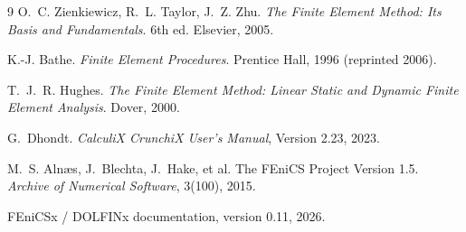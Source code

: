 \begin{thebibliography}{9}
O.~C. Zienkiewicz, R.~L. Taylor, J.~Z. Zhu.
\textit{The Finite Element Method: Its Basis and Fundamentals}. 6th ed.
Elsevier, 2005.

K.-J. Bathe.
\textit{Finite Element Procedures}. Prentice Hall, 1996 (reprinted 2006).

T.~J.~R. Hughes.
\textit{The Finite Element Method: Linear Static and Dynamic Finite Element Analysis}.
Dover, 2000.

G.~Dhondt.
\textit{CalculiX CrunchiX User's Manual}, Version 2.23, 2023.

M.~S. Aln{\ae}s, J.~Blechta, J.~Hake, et al.
The FEniCS Project Version 1.5.
\textit{Archive of Numerical Software}, 3(100), 2015.

FEniCSx / DOLFINx documentation, version 0.11, 2026.
\end{thebibliography}

